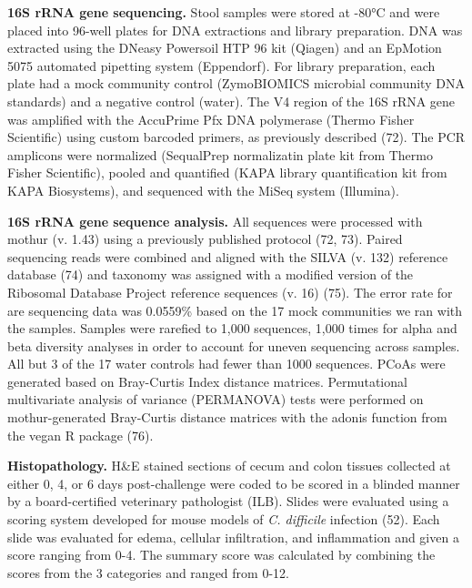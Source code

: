 \documentclass[
  11pt,
]{article}
\begin{document}
\textbf{16S rRNA gene sequencing.} Stool samples were stored at -80°C
and were placed into 96-well plates for DNA extractions and library
preparation. DNA was extracted using the DNeasy Powersoil HTP 96 kit
(Qiagen) and an EpMotion 5075 automated pipetting system (Eppendorf).
For library preparation, each plate had a mock community control
(ZymoBIOMICS microbial community DNA standards) and a negative control
(water). The V4 region of the 16S rRNA gene was amplified with the
AccuPrime Pfx DNA polymerase (Thermo Fisher Scientific) using custom
barcoded primers, as previously described (72). The PCR amplicons were
normalized (SequalPrep normalizatin plate kit from Thermo Fisher
Scientific), pooled and quantified (KAPA library quantification kit from
KAPA Biosystems), and sequenced with the MiSeq system (Illumina).

\textbf{16S rRNA gene sequence analysis.} All sequences were processed
with mothur (v. 1.43) using a previously published protocol (72, 73).
Paired sequencing reads were combined and aligned with the SILVA (v.
132) reference database (74) and taxonomy was assigned with a modified
version of the Ribosomal Database Project reference sequences (v. 16)
(75). The error rate for are sequencing data was 0.0559\% based on the
17 mock communities we ran with the samples. Samples were rarefied to
1,000 sequences, 1,000 times for alpha and beta diversity analyses in
order to account for uneven sequencing across samples. All but 3 of the
17 water controls had fewer than 1000 sequences. PCoAs were generated
based on Bray-Curtis Index distance matrices. Permutational multivariate
analysis of variance (PERMANOVA) tests were performed on
mothur-generated Bray-Curtis distance matrices with the adonis function
from the vegan R package (76).

\textbf{Histopathology.} H\&E stained sections of cecum and colon
tissues collected at either 0, 4, or 6 days post-challenge were coded to
be scored in a blinded manner by a board-certified veterinary
pathologist (ILB). Slides were evaluated using a scoring system
developed for mouse models of \emph{C. difficile} infection (52). Each
slide was evaluated for edema, cellular infiltration, and inflammation
and given a score ranging from 0-4. The summary score was calculated by
combining the scores from the 3 categories and ranged from 0-12.
\end{document}
